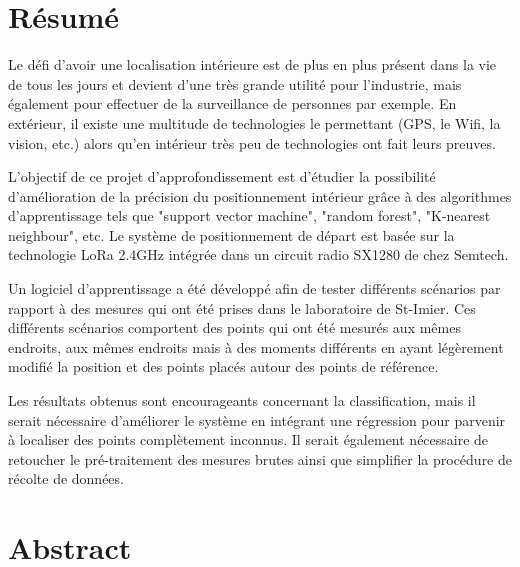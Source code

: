 \chapter*{Résumé}
Le défi d'avoir une localisation intérieure est de plus en plus présent dans la vie de tous les jours et devient d'une très grande utilité pour l'industrie, mais également pour effectuer de la surveillance de personnes par exemple. En extérieur, il existe une multitude de technologies le permettant (GPS, le Wifi, la vision, etc.) alors qu'en intérieur très peu de technologies ont fait leurs preuves.

L'objectif de ce projet d'approfondissement est d'étudier la possibilité d'amélioration de la précision du positionnement intérieur grâce à des algorithmes d'apprentissage tels que "support vector machine", "random forest", "K-nearest neighbour", etc. Le système de positionnement de départ est basée sur la technologie LoRa 2.4GHz intégrée dans un circuit radio SX1280 de chez Semtech. 

Un logiciel d'apprentissage a été développé afin de tester différents scénarios par rapport à des mesures qui ont été prises dans le laboratoire de St-Imier. Ces différents scénarios comportent des points qui ont été mesurés aux mêmes endroits, aux mêmes endroits mais à des moments différents en ayant légèrement modifié la position et des points placés autour des points de référence. 

Les résultats obtenus sont encourageants concernant la classification, mais il serait nécessaire d'améliorer le système en intégrant une régression pour parvenir à localiser des points complètement inconnus. Il serait également nécessaire de retoucher le pré-traitement des mesures brutes ainsi que simplifier la procédure de récolte de données.
  

{\let\clearpage\relax\par \chapter*{Abstract}}

	
